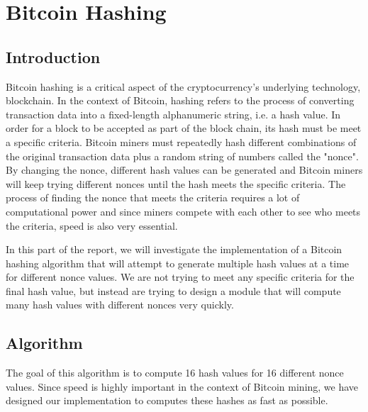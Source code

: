 \documentclass{article}
\begin{document}





\newpage
\section{Bitcoin Hashing}

\subsection{Introduction}


Bitcoin hashing is a critical aspect of the cryptocurrency's underlying technology, blockchain. In the context of Bitcoin, hashing refers to the process of converting transaction data into a fixed-length alphanumeric string, i.e. a hash value. In order for a block to be accepted as part of the block chain, its hash must be meet a specific criteria. Bitcoin miners must repeatedly hash different combinations of the original transaction data plus a random string of numbers called the "nonce". By changing the nonce, different hash values can be generated and Bitcoin miners will keep trying different nonces until the hash meets the specific criteria. The process of finding the nonce that meets the criteria requires a lot of computational power and since miners compete with each other to see who meets the criteria, speed is also very essential.

In this part of the report, we will investigate the implementation of a Bitcoin hashing algorithm that will attempt to generate multiple hash values at a time for different nonce values. We are not trying to meet any specific criteria for the final hash value, but instead are trying to design a module that will compute many hash values with different nonces very quickly.

\subsection{Algorithm}

The goal of this algorithm is to compute 16 hash values for 16 different nonce values. Since speed is highly important in the context of Bitcoin mining, we have designed our implementation to computes these hashes as fast as possible.
\end{document}
